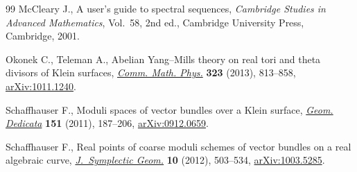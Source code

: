 \documentclass[10pt,a4paper]{amsart}
\numberwithin{equation}{section}
\begin{document}
\begin{thebibliography}{99}
McCleary J., A user's guide to spectral sequences, \textit{Cambridge Studies in
 Advanced Mathematics}, Vol.~58, 2nd ed., Cambridge University Press,
 Cambridge, 2001.

Okonek C., Teleman A., Abelian {Y}ang--{M}ills theory on real tori and theta
 divisors of {K}lein surfaces, \href{http://dx.doi.org/10.1007/s00220-013-1793-z}{\textit{Comm. Math. Phys.}} \textbf{323} (2013),
 813--858, \href{http://arxiv.org/abs/1011.1240}{arXiv:1011.1240}.

Schaf\/fhauser F., Moduli spaces of vector bundles over a {K}lein surface,
 \href{http://dx.doi.org/10.1007/s10711-010-9526-3}{\textit{Geom. Dedicata}} \textbf{151} (2011), 187--206, \href{http://arxiv.org/abs/0912.0659}{arXiv:0912.0659}.

Schaf\/fhauser F., Real points of coarse moduli schemes of vector bundles on a
 real algebraic curve, \href{http://dx.doi.org/10.4310/JSG.2012.v10.n4.a2}{\textit{J.~Symplectic Geom.}} \textbf{10} (2012),
 503--534, \href{http://arxiv.org/abs/1003.5285}{arXiv:1003.5285}.

\end{thebibliography}
\end{document}
